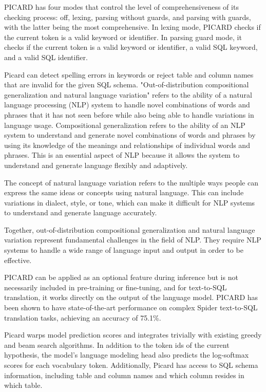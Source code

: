 PICARD has four modes that control the level of comprehensiveness of its checking process: off, lexing, parsing without guards, and parsing with guards, with the latter being the most comprehensive. In lexing mode, PICARD checks if the current token is a valid keyword or identifier. In parsing guard mode, it checks if the current token is a valid keyword or identifier, a valid SQL keyword, and a valid SQL identifier.

Picard can detect spelling errors in keywords or reject table and column names that are invalid for the given SQL schema.
"Out-of-distribution compositional generalization and natural language variation" refers to the ability of a natural language processing (NLP) system to handle novel combinations of words and phrases that it has not seen before while also being able to handle variations in language usage.
Compositional generalization refers to the ability of an NLP system to understand and generate novel combinations of words and phrases by using its knowledge of the meanings and relationships of individual words and phrases. This is an essential aspect of NLP because it allows the system to understand and generate language flexibly and adaptively.

The concept of natural language variation refers to the multiple ways people can express the same ideas or concepts using natural language. This can include variations in dialect, style, or tone, which can make it difficult for NLP systems to understand and generate language accurately.

Together, out-of-distribution compositional generalization and natural language variation represent fundamental challenges in the field of NLP. They require NLP systems to handle a wide range of language input and output in order to be effective.

PICARD can be applied as an optional feature during inference but is not necessarily included in pre-training or fine-tuning, and for text-to-SQL translation, it works directly on the output of the language model. PICARD has been shown to have state-of-the-art performance on complex Spider text-to-SQL translation tasks, achieving an accuracy of 75.1\%.

Picard warps model prediction scores and integrates trivially with existing greedy and beam search algorithms. In addition to the token ids of the current hypothesis, the model's language modeling head also predicts the log-softmax scores for each vocabulary token. Additionally, Picard has access to SQL schema information, including table and column names and which column resides in which table.

